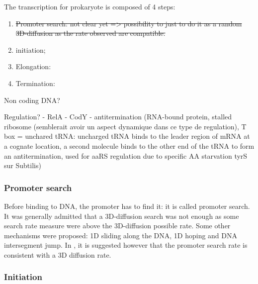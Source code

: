 The transcription for prokaryote is composed of 4 steps:
\begin{enumerate}
  \item \sout{Promoter search: not clear yet => possibility to just to do it as a random 3D-diffusion as the rate observed are compatible.}
  \item initiation;
  \item Elongation:
  \item Termination:
\end{enumerate}

\textcolor[rgb]{1.00,0.00,0.00}{Non coding DNA?}

\bigskip

\textcolor[rgb]{1.00,0.00,0.00}{\Huge Regulation?}
- RelA
- CodY
- antitermination (RNA-bound protein, stalled ribosome (semblerait avoir un aspect dynamique dans ce type de regulation), T box = unchared tRNA: uncharged tRNA binds to the leader region of mRNA at a cognate location, a second molecule binds to the other end of the tRNA to form an antitermination, used for aaRS regulation due to specific AA starvation tyrS sur Subtilis)


\subsubsection{Promoter search} Before binding to DNA, the promoter has to find it: it is called promoter search. It was generally admitted that a 3D-diffusion search was not enough as some search rate measure were above the 3D-diffusion possible rate. Some other mechanisms were proposed: 1D sliding along the DNA, 1D hoping and DNA intersegment jump. In \citep{Hal:09}, it is suggested however that the promoter search rate is consistent with a 3D diffusion rate.



\subsubsection{Initiation}

